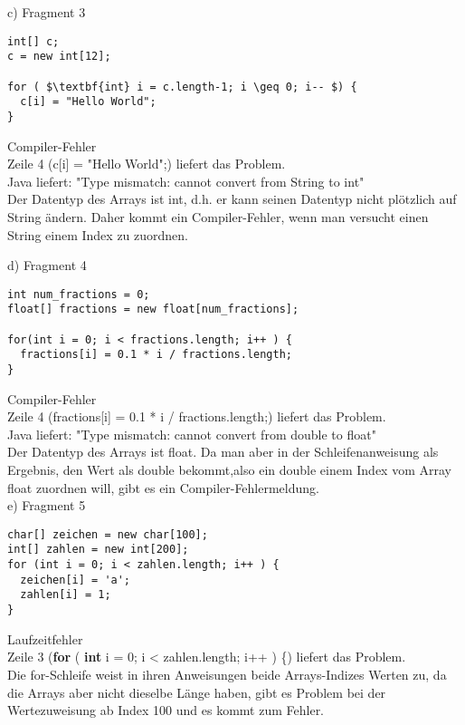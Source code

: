 \documentclass[paper=a4, fontsize=11pt]{scrartcl}
\numberwithin{equation}{section}
\numberwithin{figure}{section}
\numberwithin{table}{section}
\begin{document}
c) Fragment 3 \\

\begin{lstlisting}
int[] c; 
c = new int[12]; 

for ( $\textbf{int} i = c.length-1; i \geq 0; i-- $) {
  c[i] = "Hello World"; 
}
\end{lstlisting}

Compiler-Fehler \\
Zeile 4 (c[i] = "Hello World";) liefert das Problem. \\
Java liefert: "Type mismatch: cannot convert from String to int" \\
Der Datentyp des Arrays ist int, d.h. er kann seinen Datentyp nicht plötzlich auf String ändern. Daher kommt ein Compiler-Fehler, wenn man versucht einen String einem Index zu zuordnen.

d) Fragment 4 \\

\begin{lstlisting}
int num_fractions = 0; 
float[] fractions = new float[num_fractions]; 

for(int i = 0; i < fractions.length; i++ ) {
  fractions[i] = 0.1 * i / fractions.length; 
}
\end{lstlisting}

Compiler-Fehler \\
Zeile 4 (fractions[i] = 0.1 * i / fractions.length;) liefert das Problem. \\
Java liefert: "Type mismatch: cannot convert from double to float" \\
Der Datentyp des Arrays ist float. Da man aber in der Schleifenanweisung als Ergebnis, den Wert als double bekommt,also ein double einem Index vom Array float zuordnen will, gibt es ein Compiler-Fehlermeldung. \\

e) Fragment 5 \\

\begin{lstlisting}
char[] zeichen = new char[100]; 
int[] zahlen = new int[200]; 
for (int i = 0; i < zahlen.length; i++ ) { 
  zeichen[i] = 'a'; 
  zahlen[i] = 1;
}
\end{lstlisting}

Laufzeitfehler \\
Zeile 3 (\textbf{for} ( \textbf{int} i = 0; i < zahlen.length; i++ ) \{) liefert das Problem. \\
Die for-Schleife weist in ihren Anweisungen beide Arrays-Indizes Werten zu, da die Arrays aber nicht dieselbe Länge haben, gibt es Problem bei der Wertezuweisung ab Index 100 und es kommt zum Fehler. \\
\end{document}
